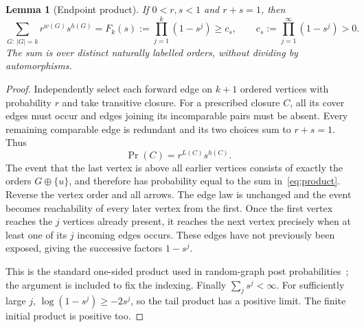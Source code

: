 \documentclass[11pt]{article}
\newtheorem{lemma}[theorem]{Lemma}
\theoremstyle{definition}
\begin{document}
\begin{lemma}[Endpoint product]\label{lem:product}
If $0<r,s<1$ and $r+s=1$, then
\begin{equation}\label{eq:product}
 \sum_{G:\,|G|=k}r^{w(G)}s^{h(G)}
 =F_k(s):=\prod_{j=1}^k(1-s^j)\ge c_s,
 \qquad c_s:=\prod_{j=1}^{\infty}(1-s^j)>0.
\end{equation}
The sum is over distinct naturally labelled orders, without dividing by
automorphisms.
\end{lemma}
\begin{proof}
Independently select each forward edge on $k+1$ ordered vertices with
probability $r$ and take transitive closure. For a prescribed closure $C$,
all its cover edges must occur and edges joining its incomparable pairs
must be absent. Every remaining comparable edge is redundant and its two
choices sum to $r+s=1$. Thus
\begin{equation}\label{eq:closure}
 \Pr(C)=r^{L(C)}s^{h(C)}.
\end{equation}
The event that the last vertex is above all earlier vertices consists of
exactly the orders $G\oplus\{u\}$, and therefore has probability equal
to the sum in~\eqref{eq:product}. Reverse the vertex order and all arrows.
The edge law is unchanged and the event becomes reachability of every later
vertex from the first. Once the first vertex reaches the $j$ vertices
already present, it reaches the next vertex precisely when at least one
of its $j$ incoming edges occurs. These edges have not previously been
exposed, giving the successive factors $1-s^j$.

This is the standard one-sided product used in random-graph post
probabilities~\cite[Sec.~2, Eq.~(2)]{BSW}; the argument is included to fix
the indexing. Finally $\sum_j s^j<\infty$. For sufficiently large $j$,
$\log(1-s^j)\ge-2s^j$, so the tail product has a positive limit. The finite
initial product is positive too.
\end{proof}
\end{document}

